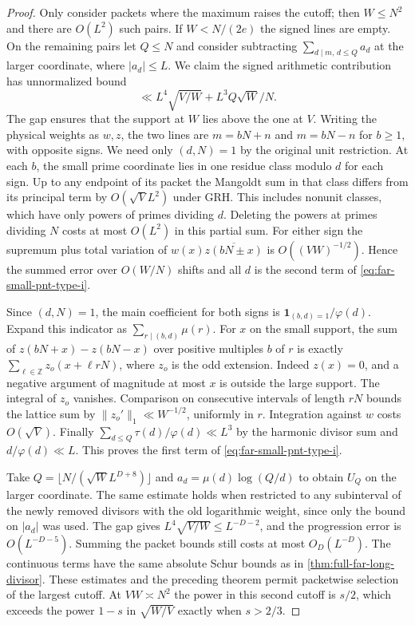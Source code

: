 \documentclass[11pt,a4paper]{article}
\numberwithin{equation}{section}
\begin{document}
\begin{proof}
Only consider packets where the maximum raises the cutoff;
then $W\le N^2$ and there are $O(L^2)$ such pairs. If
$W<N/(2e)$ the signed lines are empty. On the remaining pairs
let $Q\le N$ and consider subtracting
$\sum_{d\mid m,\,d\le Q}a_d$ at the larger coordinate,
where $|a_d|\le L$. We claim the signed arithmetic contribution
has unnormalized bound
\begin{equation}
 \ll L^4\sqrt{V/W}+ L^3 Q\sqrt W/N .
 \label{eq:far-small-pnt-type-i}
\end{equation}
The gap ensures that the support at $W$ lies above the one at
$V$. Writing the physical weights as $w,z$, the two lines
are $m=bN+n$ and $m=bN-n$ for $b\ge1$, with opposite signs.
We need only $(d,N)=1$ by the original unit restriction.
At each $b$, the small prime coordinate lies in one residue
class modulo $d$ for each sign. Up to any endpoint of its
packet the Mangoldt sum in that class differs from its
principal term by $O(\sqrt V L^2)$ under GRH. This includes
nonunit classes, which have only powers of primes dividing $d$.
Deleting the powers at primes dividing $N$ costs at most
$O(L^2)$ in this partial sum. For either sign the supremum
plus total variation of $w(x)\overline{z(bN\pm x)}$ is
$O((VW)^{-1/2})$. Hence the summed error over $O(W/N)$ shifts
and all $d$ is the second term of \eqref{eq:far-small-pnt-type-i}.

Since $(d,N)=1$, the main coefficient for both signs is
$\mathbf1_{(b,d)=1}/\varphi(d)$. Expand this indicator as
$\sum_{r\mid(b,d)}\mu(r)$. For $x$ on the small support,
the sum of $z(bN+x)-z(bN-x)$ over positive multiples $b$ of
$r$ is exactly $\sum_{\ell\in\mathbb Z}z_o(x+\ell rN)$,
where $z_o$ is the odd extension. Indeed $z(x)=0$, and a
negative argument of magnitude at most $x$ is outside the
large support. The integral of $z_o$ vanishes. Comparison
on consecutive intervals of length $rN$ bounds the lattice
sum by $\|z_o'\|_1\ll W^{-1/2}$, uniformly in $r$. Integration
against $w$ costs $O(\sqrt V)$. Finally
$\sum_{d\le Q}\tau(d)/\varphi(d)\ll L^3$ by the harmonic
divisor sum and $d/\varphi(d)\ll L$. This proves the first
term of \eqref{eq:far-small-pnt-type-i}.

Take $Q=\lfloor N/(\sqrt W L^{D+8})\rfloor$ and
$a_d=\mu(d)\log(Q/d)$ to obtain $U_Q$ on the larger coordinate.
The same estimate holds when restricted to any subinterval
of the newly removed divisors with the old logarithmic weight,
since only the bound on $|a_d|$ was used. The gap gives
$L^4\sqrt{V/W}\le L^{-D-2}$, and the progression error is
$O(L^{-D-5})$. Summing the packet bounds still costs at most
$O_D(L^{-D})$. The continuous terms have the same absolute
Schur bounds as in \cref{thm:full-far-long-divisor}. These
estimates and the preceding theorem permit packetwise selection
of the largest cutoff. At $VW\asymp N^2$ the power in this
second cutoff is $s/2$, which exceeds the power $1-s$ in
$\sqrt{W/V}$ exactly when $s>2/3$.
\end{proof}
\end{document}
